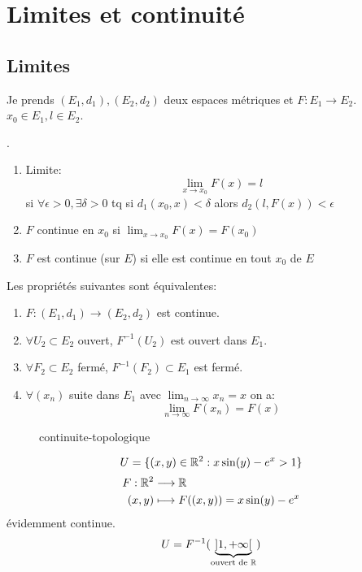 \section{Limites et continuité}
\subsection{Limites}
Je prends $(E_1, d_1), (E_2, d_2)$ deux espaces métriques et $F: E_1 \to E_2$. $x_0 \in E_1, l \in E_2$.
\begin{definition}.
    \begin{enumerate}
        \item Limite:
            \[
            \lim_{x \to x_0} F(x) = l
            \] 
            si $\forall \epsilon > 0, \exists \delta > 0$ tq si $d_1(x_0, x) < \delta$ alors $d_2(l, F(x)) < \epsilon$
        \item $F$ continue en  $x_0$ si $\lim_{x \to x_0} F(x) = F(x_0)$
        \item $F$ est continue (sur $E$) si elle est continue en tout $x_0$ de $E$
\end{enumerate}
\end{definition}
\begin{prop}\label{prop:continuité-de-fonctions}
   Les propriétés suivantes sont équivalentes: 
   \begin{enumerate}
       \item $F: (E_1, d_1) \to  (E_2, d_2)$ est continue.
       \item $\forall U_2 \subset  E_2$ ouvert, $F^{-1}(U_2)$ est ouvert dans $E_1$.
       \item $\forall F_2 \subset E_2$ fermé, $F^{-1}(F_2) \subset E_1$ est fermé.
        \item $\forall (x_n)$ suite dans $E_1$ avec $\lim_{n \to \infty} x_n = x$ on a:
            \[
            \lim_{n \to \infty} F(x_n) = F(x)
            \] 
   \end{enumerate}
\end{prop}
\begin{figure}[H]
    \centering
    \caption{continuite-topologique}
    \label{fig:continuite-topologique}
\end{figure}
\begin{eg}
   \[
       U = \{(x, y) \in \mathbb{R}^2: x \sin(y) - e^x > 1\}
   \]  
   \begin{align*}
       F: \mathbb{R}^2 &\longrightarrow \mathbb{R} \\
       (x, y) &\longmapsto F((x, y)) = x \sin(y) - e^x
   \end{align*}
   évidemment continue.
   \[
       U = F^{-1}(\underbrace{]1, +\infty[}_{\text{ouvert de } \mathbb{R}})
   \] 
\end{eg}
